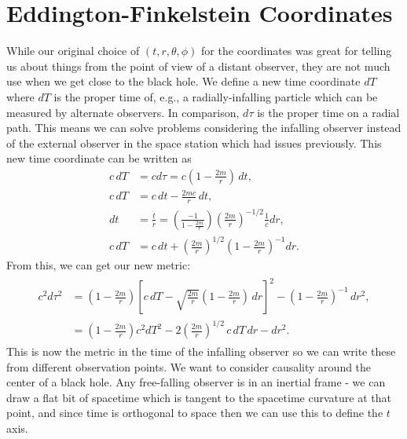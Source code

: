 \documentclass[a4paper, 11pt, normalem]{report}
\begin{document}
\section{Eddington-Finkelstein Coordinates}
While our original choice of $(t,r,\theta,\phi)$ for the coordinates was great for telling us about things from the point of view of a distant observer, they are not much use when we get close to the black hole. 
We define a new time coordinate $dT$ where $dT$ is the proper time of, e.g., a radially-infalling particle which can be measured by alternate observers. 
In comparison, $d\tau$ is the proper time on a radial path. 
This means we can solve problems considering the infalling observer instead of the external observer in the space station which had issues previously.
This new time coordinate can be written as
\begin{align}
    c\,dT &= cd\tau = c\left(1-\frac{2m}{r}\right)\,dt, \\
    c\,dT &= c\,dt - \frac{2mc}{r}\,dt,\\
    dt &= \frac{\dot{t}}{\dot{r}} = \left(\frac{-1}{1-\frac{2m}{r}}\right)\left(\frac{2m}{r}\right)^{-1/2}\frac{1}{c}dr, \\
    c\,dT &= c\,dt + \left(\frac{2m}{r}\right)^{1/2}\left(1-\frac{2m}{r}\right)^{-1}dr.
\end{align}
From this, we can get our new metric:
\begin{align}
    \begin{split}
        c^2d\tau^2 &= \left(1-\frac{2m}{r}\right)\left[c\,dT - \sqrt{\frac{2m}{r}}\left(1-\frac{2m}{r}\right)\,dr\right]^2 - \left(1-\frac{2m}{r}\right)^{-1}\,dr^2, \\
                   &= \left(1-\frac{2m}{r}\right)c^2dT^2 - 2\left(\frac{2m}{r}\right)^{1/2}\,c\,dT\,dr - dr^2.
    \end{split}
\end{align}
This is now the metric in the time of the infalling observer so we can write these from different observation points. 
We want to consider causality around the center of a black hole. 
Any free-falling observer is in an inertial frame - we can draw a flat bit of spacetime which is tangent to the spacetime curvature at that point, and since time is orthogonal to space then we can use this to define the $t$ axis. 
\begin{figure}[H]
    \centering
\end{figure}
\end{document}
